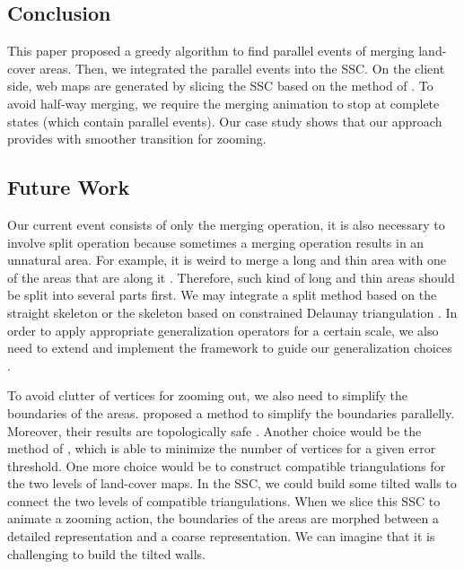 \documentclass[ijgi,article,submit,moreauthors,pdftex]{Definitions/mdpi}
\begin{document}
\subsection{Conclusion}
This paper proposed a greedy algorithm to find parallel events of 
merging land-cover areas.
Then, we integrated the parallel events into the SSC. 
On the client side, web maps are generated by slicing the SSC
based on the method of \citet{Meijers2020Web}.
To avoid half-way merging, we require the merging animation 
to stop at complete states (which contain parallel events).
Our case study shows that 
our approach provides with smoother transition for zooming.


\subsection{Future Work}



Our current event consists of only the merging operation,
it is also necessary to involve split operation
because sometimes a merging operation results in an unnatural area.
For example, it is weird to merge a long and thin area 
with one of the areas that are along it
\citep[see][]{Haunert2008Skeleton}.
Therefore, such kind of long and thin areas should be
split into several parts first.
We may integrate a split method based on the straight skeleton
\citep{Haunert2008Skeleton}
or the skeleton based on constrained Delaunay triangulation
\citep{Meijers2016Split}.
In order to apply appropriate generalization operators
for a certain scale,
we also need to extend and implement the framework 
to guide our generalization choices
\citep{Meijers2018Framework}.

To avoid clutter of vertices for zooming out, 
we also need to simplify the boundaries of the areas.
\citet{Meijers2011LineSimp} proposed a method 
to simplify the boundaries parallelly. 
Moreover, their results are topologically safe . 
Another choice would be the method of \citet{ImaiIri1988},
which is able to minimize the number of vertices 
for a given error threshold.
One more choice would be to construct compatible triangulations 
\citep[see][]{Peng2019Thesis}
for the two levels of land-cover maps.
In the SSC, we could build some tilted walls 
to connect the two levels of compatible triangulations.
When we slice this SSC to animate a zooming action,
the boundaries of the areas are morphed 
between a detailed representation and a coarse representation.
We can imagine that it is challenging to build the tilted walls.
\end{document}
